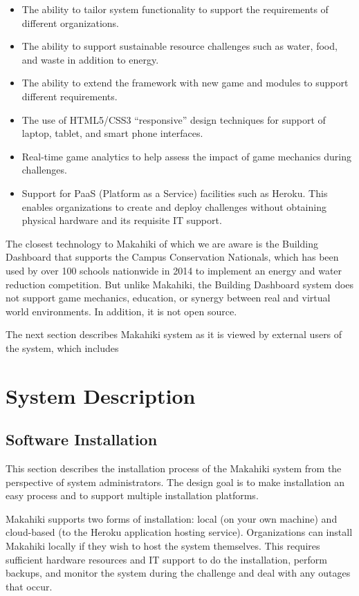 \begin{itemize}
\item The ability to tailor system functionality to support the requirements of different organizations.
\item The ability to support sustainable resource challenges such as water, food, and waste in addition to energy.
\item The ability to extend the framework with new game and modules to support different requirements.
\item The use of HTML5/CSS3 ``responsive'' design techniques for support of laptop, tablet, and smart phone interfaces.
\item Real-time game analytics to help assess the impact of game mechanics during challenges.
\item Support for PaaS (Platform as a Service) facilities such as Heroku. This enables organizations to create and deploy challenges without obtaining physical hardware and its requisite IT support.
\end{itemize}

The closest technology to Makahiki of which we are aware is the Building Dashboard that supports the Campus Conservation Nationals, which has been used by over 100 schools nationwide in 2014 to implement an energy and water reduction competition. But unlike Makahiki, the Building Dashboard system does not support game mechanics, education, or synergy between real and virtual world environments. In addition, it is not open source.

The next section describes Makahiki system as it is viewed by external users of the system, which includes 

\section{System Description}
\label{sec:makahiki-design-description}

\subsection{Software Installation}

This section describes the installation process of the Makahiki system from the perspective of system administrators. The design goal is to make installation an easy process and to support multiple installation platforms.

Makahiki supports two forms of installation: local (on your own machine) and cloud-based (to the Heroku application hosting service). Organizations can install Makahiki locally if they wish to host the system themselves. This requires sufficient hardware resources and IT support to do the installation, perform backups, and monitor the system during the challenge and deal with any outages that occur.

